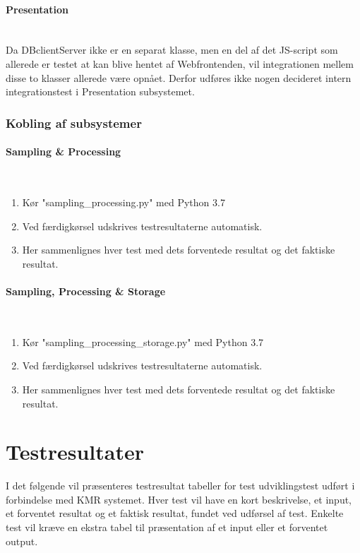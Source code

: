 \begin{appendices}
\paragraph{Presentation} \mbox{}\\
Da DBclientServer ikke er en separat klasse, men en del af det JS-script som allerede er testet at kan blive hentet af Webfrontenden, vil integrationen mellem disse to klasser allerede være opnået. Derfor udføres ikke nogen decideret intern integrationstest i Presentation subsystemet.

\subsubsection{Kobling af subsystemer}

\paragraph{Sampling \& Processing} \mbox{}\\
\begin{enumerate}
	\item Kør "sampling\_processing.py" med Python 3.7
	\item Ved færdigkørsel udskrives testresultaterne automatisk.
	\item Her sammenlignes hver test med dets forventede resultat og det faktiske resultat.
\end{enumerate}

\paragraph{Sampling, Processing \& Storage} \mbox{}\\
\begin{enumerate}
	\item Kør "sampling\_processing\_storage.py" med Python 3.7
	\item Ved færdigkørsel udskrives testresultaterne automatisk.
	\item Her sammenlignes hver test med dets forventede resultat og det faktiske resultat.
\end{enumerate}


\pagebreak
\section{Testresultater}
I det følgende vil præsenteres testresultat tabeller for test udviklingstest udført i forbindelse med KMR systemet. Hver test vil have en kort beskrivelse, et input, et forventet resultat og et faktisk resultat, fundet ved udførsel af test. Enkelte test vil kræve en ekstra tabel til præsentation af et input eller et forventet output.


\end{appendices}

